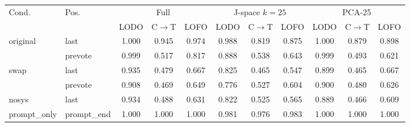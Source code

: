 \begin{tabular}{llccccccccc}\toprule
Cond. & Pos. & \multicolumn{3}{c}{Full} & \multicolumn{3}{c}{J-space $k{=}25$} & \multicolumn{3}{c}{PCA-25}\\
 & & LODO & C$\to$T & LOFO & LODO & C$\to$T & LOFO & LODO & C$\to$T & LOFO\\\midrule
original & last & 1.000 & 0.945 & 0.974 & 0.988 & 0.819 & 0.875 & 1.000 & 0.879 & 0.898\\
 & prevote & 0.999 & 0.517 & 0.817 & 0.888 & 0.538 & 0.643 & 0.999 & 0.493 & 0.621\\
swap & last & 0.935 & 0.479 & 0.667 & 0.825 & 0.465 & 0.547 & 0.899 & 0.465 & 0.667\\
 & prevote & 0.908 & 0.469 & 0.649 & 0.776 & 0.527 & 0.604 & 0.900 & 0.480 & 0.626\\
nosys & last & 0.934 & 0.488 & 0.631 & 0.822 & 0.525 & 0.565 & 0.889 & 0.466 & 0.609\\
prompt\_only & prompt\_end & 1.000 & 1.000 & 1.000 & 0.981 & 0.976 & 0.983 & 1.000 & 1.000 & 1.000\\
\bottomrule\end{tabular}
